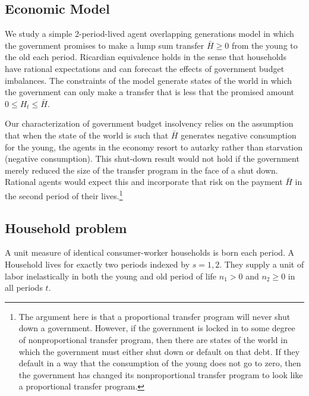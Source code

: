 \documentclass[letterpaper,12pt]{article}
\theoremstyle{definition}
\begin{document}
\begin{spacing}{1.5}
\section{Economic Model}\label{SecModel}

  We study a simple 2-period-lived agent overlapping generations model in which the government promises to make a lump sum transfer $\bar{H}\geq 0$ from the young to the old each period. Ricardian equivalence holds in the sense that households have rational expectations and can forecast the effects of government budget imbalances. The constraints of the model generate states of the world in which the government can only make a transfer that is less that the promised amount $0 \leq H_t \leq \bar{H}$.

  Our characterization of government budget insolvency relies on the assumption that when the state of the world is such that $\bar{H}$ generates negative consumption for the young, the agents in the economy resort to autarky rather than starvation (negative consumption). This shut-down result would not hold if the government merely reduced the size of the transfer program in the face of a shut down. Rational agents would expect this and incorporate that risk on the payment $\bar{H}$ in the second period of their lives.\footnote{The argument here is that a proportional transfer program will never shut down a government. However, if the government is locked in to some degree of nonproportional transfer program, then there are states of the world in which the government must either shut down or default on that debt. If they default in a way that the consumption of the young does not go to zero, then the government has changed its nonproportional transfer program to look like a proportional transfer program.}


  \subsection{Household problem}\label{SecModelHH}

    A unit measure of identical consumer-worker households is born each period. A Household lives for exactly two periods indexed by $s=1,2$. They supply a unit of labor inelastically in both the young and old period of life $n_1>0$ and $n_2\geq 0$ in all periods $t$.


\end{spacing}
\end{document}
